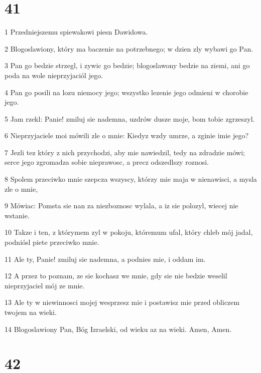 \chapter{41}

\par 1 Przedniejszemu spiewakowi piesn Dawidowa.
\par 2 Blogoslawiony, który ma baczenie na potrzebnego; w dzien zly wybawi go Pan.
\par 3 Pan go bedzie strzegl, i zywic go bedzie; blogoslawony bedzie na ziemi, ani go poda na wole nieprzyjaciól jego.
\par 4 Pan go posili na lozu niemocy jego; wszystko lezenie jego odmieni w chorobie jego.
\par 5 Jam rzekl: Panie! zmiluj sie nademna, uzdrów dusze moje, bom tobie zgrzeszyl.
\par 6 Nieprzyjaciele moi mówili zle o mnie: Kiedyz wzdy umrze, a zginie imie jego?
\par 7 Jezli tez który z nich przychodzi, aby mie nawiedzil, tedy na zdradzie mówi; serce jego zgromadza sobie nieprawosc, a precz odszedlszy roznosi.
\par 8 Spolem przeciwko mnie szepcza wszyscy, którzy mie maja w nienawisci, a mysla zle o mnie,
\par 9 Mówiac: Pomsta sie nan za niezboznosc wylala, a iz sie polozyl, wiecej nie wstanie.
\par 10 Takze i ten, z którymem zyl w pokoju, któremum ufal, który chleb mój jadal, podniósl piete przeciwko mnie.
\par 11 Ale ty, Panie! zmiluj sie nademna, a podnies mie, i oddam im.
\par 12 A przez to poznam, ze sie kochasz we mnie, gdy sie nie bedzie weselil nieprzyjaciel mój ze mnie.
\par 13 Ale ty w niewinnosci mojej wesprzesz mie i postawisz mie przed obliczem twojem na wieki.
\par 14 Blogoslawiony Pan, Bóg Izraelski, od wieku az na wieki. Amen, Amen.

\chapter{42}


